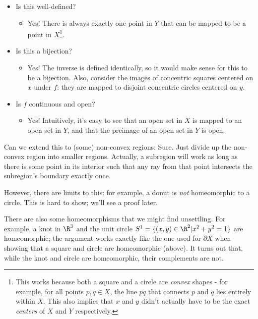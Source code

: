 \begin{itemize}
\item Is this well-defined?  
\begin{itemize}\item Yes!  There is always exactly one point in $Y$ that can be mapped to be a point in $X$\footnote{This works because both a square and a circle are \emph{convex} shapes - for example, for all points $p,q\in X$, the line $\overline{pq}$ that connects $p$ and $q$ lies entirely within $X$.  This also implies that $x$ and $y$ didn't actually have to be the exact \emph{centers} of $X$ and $Y$ respectively.}.\end{itemize}
\item Is this a bijection? 
\begin{itemize}\item Yes!  The inverse is defined identically, so it would make sense for this to be a bijection.  Also, consider the images of concentric squares centered on $x$ under $f$: they are mapped to disjoint concentric circles centered on $y$.\end{itemize}
\item Is $f$ continuous and open?
\begin{itemize}
\item Yes!  Intuitively, it's easy to see that an open set in $X$ is mapped to an open set in $Y$, and that the preimage of an open set in $Y$ is open.
\end{itemize}
\end{itemize}

Can we extend this to (some) non-convex regions:
\placeholder\placeholder
Sure.  Just divide up the non-convex region into smaller regions.  Actually, a subregion will work as long as there is some point in its interior such that any ray from that point intersects the subregion's boundary exactly once.

However, there are limits to this: for example, a donut is \emph{not} homeomorphic to a circle.  This is hard to show; we'll see a proof later.

There are also some homeomorphisms that we might find unsettling.  For example, a knot in $\R^3$ and the unit circle $S^1 = \{ (x,y)\in\R^2 | x^2+y^2 = 1\}$ are homeomorphic; the argument works exactly like the one used for $\partial X$ when showing that a square and circle are homeomorphic (above).  It turns out that, while the knot and circle are homeomorphic, their complements are not.

